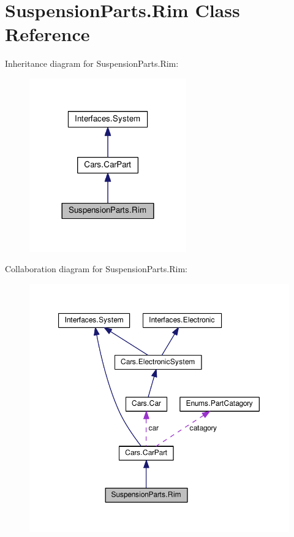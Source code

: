 \hypertarget{classSuspensionParts_1_1Rim}{}\section{Suspension\+Parts.\+Rim Class Reference}
\label{classSuspensionParts_1_1Rim}


Inheritance diagram for Suspension\+Parts.\+Rim\+:\nopagebreak
\begin{figure}[H]
\begin{center}
\leavevmode
\includegraphics[width=192pt]{classSuspensionParts_1_1Rim__inherit__graph}
\end{center}
\end{figure}


Collaboration diagram for Suspension\+Parts.\+Rim\+:\nopagebreak
\begin{figure}[H]
\begin{center}
\leavevmode
\includegraphics[width=350pt]{classSuspensionParts_1_1Rim__coll__graph}
\end{center}
\end{figure}

